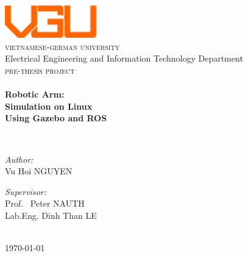 \begin{titlepage}
\begin{center}

\includegraphics[width=0.3\textwidth]{./image/vgu_logo.png}~\\[1cm]
\textsc{\LARGE vietnamese-german university}~\\[0.2cm]
Electrical Engineering and Information Technology Department ~\\[3cm]
\textsc{\Large pre-thesis project}\\[0.5cm]

\HRule \\[0.4cm]
{ \huge \bfseries Robotic Arm:\\ Simulation on Linux \\ Using Gazebo and ROS \\[0.5cm] }

\HRule \\[3cm]

\noindent
\begin{minipage}[t]{0.4\textwidth}
\begin{flushleft} \large
\emph{Author:}\\
Vu Hoi \textsc{NGUYEN}
\end{flushleft}
\end{minipage}%
\begin{minipage}[t]{0.4\textwidth}
\begin{flushright} \large
\emph{Supervisor:} \\
Prof. ~Peter \textsc{NAUTH} \\
Lab.Eng. Dinh Than \textsc{LE}
\end{flushright}
\end{minipage}
\vfill

~\\[1cm]
{\large \today}

\end{center}


\end{titlepage}
